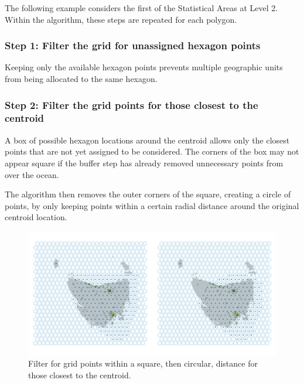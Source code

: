 \documentclass[
]{jss}
\begin{document}
The following example considers the first of the Statistical Areas at
Level 2. Within the algorithm, these steps are repeated for each
polygon.

\hypertarget{step-1-filter-the-grid-for-unassigned-hexagon-points}{%
\subsubsection{Step 1: Filter the grid for unassigned hexagon
points}\label{step-1-filter-the-grid-for-unassigned-hexagon-points}}

Keeping only the available hexagon points prevents multiple geographic
units from being allocated to the same hexagon.

\hypertarget{step-2-filter-the-grid-points-for-those-closest-to-the-centroid}{%
\subsubsection{Step 2: Filter the grid points for those closest to the
centroid}\label{step-2-filter-the-grid-points-for-those-closest-to-the-centroid}}

A box of possible hexagon locations around the centroid allows only the
closest points that are not yet assigned to be considered. The corners
of the box may not appear square if the buffer step has already removed
unnecessary points from over the ocean.

The algorithm then removes the outer corners of the square, creating a
circle of points, by only keeping points within a certain radial
distance around the original centroid location.

\begin{CodeChunk}
\begin{figure}

{\centering \includegraphics[width=1\linewidth]{figures/4grid} 

}

\caption[Filter for grid points within a square, then circular, distance for those closest to the centroid]{Filter for grid points within a square, then circular, distance for those closest to the centroid.}\label{fig:buffers}
\end{figure}
\end{CodeChunk}
\end{document}
